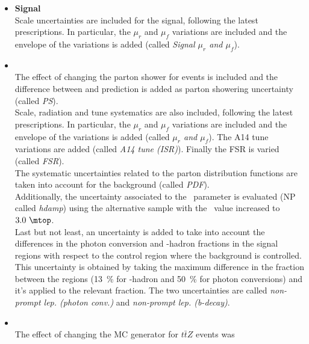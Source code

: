 \begin{itemize}	
	\item \textbf{Signal} \\ 
	Scale uncertainties are included for the signal, following the
	latest prescriptions. In particular, the $\mu_r$ and $\mu_f$
	variations are included and the envelope of the variations is added 
	(called \textit{Signal $\mu_r$ and $\mu_f$}). \\
	\item \textbf{\ttbar} \\
	The effect of changing the parton shower for \ttbar events is
	included and the difference between \PythiaEight and 
	prediction is added as \ttbar parton showering uncertainty (called
	\textit{\ttbar PS}). \\
	Scale, radiation and tune systematics are also included, following the
	latest prescriptions. In particular, the $\mu_r$ and $\mu_f$
	variations are included and the envelope of the variations is added 
	(called \textit{\ttbar $\mu_r$ and $\mu_f$}). The A14 tune
	variations are added (called \textit{\ttbar A14 tune (ISR)}). Finally the FSR is varied (called \textit{\ttbar FSR}). \\  
	The systematic uncertainties related to the parton distribution
	functions are taken into account for the \ttbar background (called
	\textit{\ttbar PDF}). \\
	Additionally, the uncertainty associated to the \hdamp\ parameter is evaluated (NP called \textit{\ttbar hdamp})
	using the alternative sample with the \hdamp\ value increased to $3.0~\mtop$.\\
	Last but not least, an uncertainty is added to take into account the differences in the
	photon conversion and \Pqb-hadron fractions in the signal regions with
	respect to the \ttbar control region where the \ttbar background is
	controlled. 
	This uncertainty is obtained by taking the maximum
	difference in the fraction between the regions (\SI{13}{\%} for
	\Pqb-hadron and \SI{50}{\%} for photon conversions) and it's applied
	to the relevant fraction. 
	The two uncertainties are called
	\textit{\ttbar non-prompt lep. (photon conv.)} and 
	\textit{\ttbar non-prompt lep. (b-decay)}. \\
	\item \textbf{\ttZ} \\
	The effect of changing the MC generator for $t\bar{t}Z$ events was

\end{itemize}
